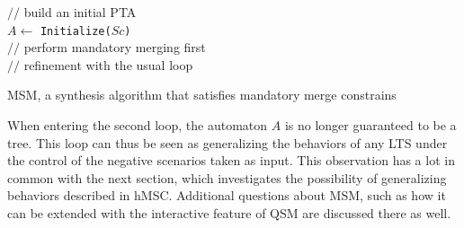 \begin{algorithm}
{
\vspace{0.2cm}
\vspace{0.15cm}
$//$ build an initial PTA \\
$A \leftarrow $ {\tt Initialize($Sc$)}\\
\vspace{0.15cm}
$//$ perform mandatory merging first\\
\vspace{0.15cm}
$//$ refinement with the usual loop\\
\vspace{0.15cm}
}
\vspace{0.2cm}
\caption{\textsc{MSM}, a synthesis algorithm that satisfies mandatory merge constrains\label{MSM}}
\end{algorithm}

When entering the second loop, the automaton $A$ is no longer guaranteed to be a tree. This loop can thus be seen as generalizing the behaviors of any LTS under the control of the negative scenarios taken as input. This observation has a lot in common with the next section, which investigates the possibility of generalizing behaviors described in hMSC. Additional questions about MSM, such as how it can be extended with the interactive feature of QSM are discussed there as well. 

